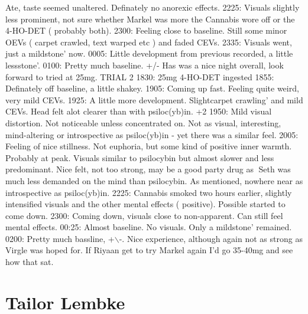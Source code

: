\documentclass[12pt]{book}
\begin{document}
Ate, taste seemed unaltered. Definately no anorexic effects. 2225: Visuals slightly less prominent, not sure whether Markel was more the Cannabis wore off or the 4-HO-DET ( probably both). 2300: Feeling close to baseline. Still some minor OEVs ( carpet crawled, text warped etc ) and faded CEVs. 2335: Visuals went, just a mildstone' now. 0005: Little development from previous recorded, a little lessstone'. 0100: Pretty much baseline. +/- Has was a nice night overall, look forward to tried at 25mg. TRIAL 2 1830: 25mg 4-HO-DET ingested 1855: Definately off baseline, a little shakey. 1905: Coming up fast. Feeling quite weird, very mild CEVs. 1925: A little more development. Slightcarpet crawling' and mild CEVs. Head felt alot clearer than with psiloc(yb)in. +2 1950: Mild visual distortion. Not noticeable unless concentrated on. Not as visual, interesting, mind-altering or introspective as psiloc(yb)in - yet there was a similar feel. 2005: Feeling of nice stillness. Not euphoria, but some kind of positive inner warmth. Probably at peak. Visuals similar to psilocybin but almost slower and less predominant. Nice felt, not too strong, may be a good party drug as Seth was much less demanded on the mind than psilocybin. As mentioned, nowhere near as introspective as psiloc(yb)in. 2225: Cannabis smoked two hours earlier, slightly intensified visuals and the other mental effects ( positive). Possible started to come down. 2300: Coming down, visuals close to non-apparent. Can still feel mental effects. 00:25: Almost baseline. No visuals. Only a mildstone' remained. 0200: Pretty much bassline, +$\backslash$-. Nice experience, although again not as strong as Virgle was hoped for. If Riyaan get to try Markel again I'd go 35-40mg and see how that sat.



\chapter{Tailor Lembke}
\end{document}
